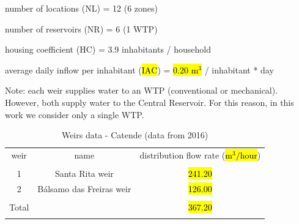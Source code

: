 \documentclass{singlecol}
\theoremstyle{TH}{
\newtheorem{lemma}{Lemma}
\newtheorem{theorem}[lemma]{Theorem}
\newtheorem{corrolary}[lemma]{Corrolary}
\newtheorem{conjecture}[lemma]{Conjecture}
\newtheorem{proposition}[lemma]{Proposition}
\newtheorem{claim}[lemma]{Claim}
\newtheorem{stheorem}[lemma]{Wrong Theorem}
\newtheorem{algorithm}{Algorithm}
}
\theoremstyle{THrm}{
\newtheorem{definition}{Definition}[section]
\newtheorem{question}{Question}[section]
\newtheorem{remark}{Remark}
\newtheorem{scheme}{Scheme}
}
\theoremstyle{THhit}{
\newtheorem{case}{Case}[section]
}
\begin{document}
\noindent number of locations (NL) = 12 (6 zones) 

\noindent number of reservoirs (NR) = 6 (1 WTP) 

\noindent housing coefficient ($\mathrm{HC}$) = 3.9 inhabitants / household 

\noindent average daily inflow per inhabitant (\hl{$\mathrm{IAC}$}) = \hl{0.20 $\mathrm{m^3}$} / inhabitant * day 

\noindent Note: each weir supplies water to an WTP (conventional or mechanical). However, both supply water to the Central Reservoir. For this reason, in this work we consider only a single WTP. 

\begin{table}[H]
\begin{center}
	\begin{tabular}{ c  c  c } 
		weir      & name        & distribution flow rate  (\hl{$\mathrm{m^3/hour}$})     \\
		                                                                    \\
		1              & Santa Rita weir            & \hl{241.20}         \\
		2              & Bálsamo das Freiras  weir  & \hl{126.00}         \\
							                                                \\
		\hline
		Total          &                               & \hl{367.20}        \\
		\\
	\end{tabular}
\caption{Weirs data - Catende (data from 2016)}
\label{tab:weirsCatende}
\end{center}
\end{table}
\end{document}
